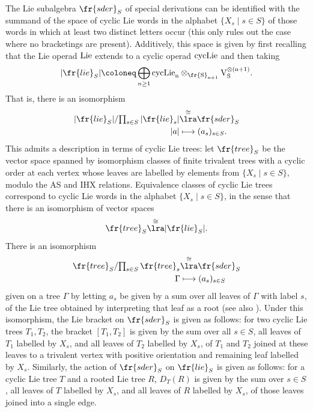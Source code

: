 \documentclass[a4paper]{amsart}
\begin{document}
The Lie subalgebra $\fr{sder}_S$ of special derivations can be identified with the summand of the space of cyclic Lie words in the alphabet $\{X_s \mid s \in S\}$ of those words in which at least two distinct letters occur (this only rules out the case where no bracketings are present). Additively, this space is given by first recalling that the Lie operad $\rm{Lie}$ extends to a cyclic operad $\rm{cycLie}$ and then taking 
\[|\fr{lie}_S| \coloneq \bigoplus_{n \geq 1} \rm{cycLie}_n \otimes_{\fr{S}_{n+1}} V_S^{\otimes (n+1)}.\]
That is, there is an isomorphism
\begin{align*} |\fr{lie}_S|/{\textstyle \prod_{s \in S} |\fr{lie}_s|} &\overset{\cong}\lra \fr{sder}_S \\
    |a| &\longmapsto (a_s)_{s \in S}.\end{align*}
This admits a description in terms of cyclic Lie trees: let $\fr{tree}_S$ be the vector space spanned by isomorphism classes of finite trivalent trees with a cyclic order at each vertex whose leaves are labelled by elements from $\{X_s \mid s \in S\}$, modulo the AS and IHX relations. Equivalence classes of cyclic Lie trees correspond to cyclic Lie words in the alphabet $\{X_s \mid s \in S\}$, in the sense that there is an isomorphism of vector spaces
\[\fr{tree}_S \overset{\cong}\lra |\fr{lie}_S|.\]
There is an isomorphism 
\begin{align*}\fr{tree}_S/{\textstyle \prod_{s \in S} \fr{tree}_s} & \overset{\cong}\lra \fr{sder}_S \\
\Gamma &\longmapsto (a_s)_{s \in S} \end{align*}
given on a tree $\Gamma$ by letting $a_s$ be given by a sum over all leaves of $\Gamma$ with label $s$, of the Lie tree obtained by interpreting that leaf as a root \cite[Section 2.2.1]{AlekseevTorossian} (see also \cite[Appendix A]{Felder}). Under this isomorphism, the Lie bracket on $\fr{sder}_S$ is given as follows: for two cyclic Lie trees $T_1,T_2$, the bracket $[T_1,T_2]$ is given by the sum over all $s \in S$, all leaves of $T_1$ labelled by $X_s$, and all leaves of $T_2$ labelled by $X_s$, of $T_1$ and $T_2$ joined at these leaves to a trivalent vertex with positive orientation and remaining leaf labelled by $X_s$. Similarly, the action of $\fr{sder}_S$ on $\fr{lie}_S$ is given as follows: for a cyclic Lie tree $T$ and a rooted Lie tree $R$, $D_T(R)$ is given by the sum over $s \in S$, all leaves of $T$ labelled by $X_s$, and all leaves of $R$ labelled by $X_s$, of those leaves joined into a single edge.
\end{document}
